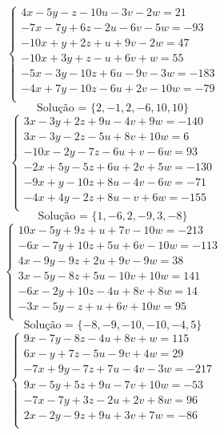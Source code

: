 \documentclass[12pt,oneside,a4paper]{article}
\begin{document}
\vspace{\baselineskip}
\begin{equation*}
\begin{cases}
4x-5y-z-10u-3v-2w=21 \\
-7x-7y+6z-2u-6v-5w=-93 \\
-10x+y+2z+u+9v-2w=47 \\
-10x+3y+z-u+6v+w=55 \\
-5x-3y-10z+6u-9v-3w=-183 \\
-4x+7y-10z-6u+2v-10w=-79 \\
\end{cases}
\end{equation*}
\begin{equation*}
\text{Solução = }\{2,-1,2,-6,10,10\}
\end{equation*}
\vspace{\baselineskip}
\begin{equation*}
\begin{cases}
3x-3y+2z+9u-4v+9w=-140 \\
3x-3y-2z-5u+8v+10w=6 \\
-10x-2y-7z-6u+v-6w=93 \\
-2x+5y-5z+6u+2v+5w=-130 \\
-9x+y-10z+8u-4v-6w=-71 \\
-4x+4y-2z+8u-v+6w=-155 \\
\end{cases}
\end{equation*}
\begin{equation*}
\text{Solução = }\{1,-6,2,-9,3,-8\}
\end{equation*}
\vspace{\baselineskip}
\begin{equation*}
\begin{cases}
10x-5y+9z+u+7v-10w=-213 \\
-6x-7y+10z+5u+6v-10w=-113 \\
4x-9y-9z+2u+9v-9w=38 \\
3x-5y-8z+5u-10v+10w=141 \\
-6x-2y+10z-4u+8v+8w=14 \\
-3x-5y-z+u+6v+10w=95 \\
\end{cases}
\end{equation*}
\begin{equation*}
\text{Solução = }\{-8,-9,-10,-10,-4,5\}
\end{equation*}
\vspace{\baselineskip}
\begin{equation*}
\begin{cases}
9x-7y-8z-4u+8v+w=115 \\
6x-y+7z-5u-9v+4w=29 \\
-7x+9y-7z+7u-4v-3w=-217 \\
9x-5y+5z+9u-7v+10w=-53 \\
-7x-7y+3z-2u+2v+8w=96 \\
2x-2y-9z+9u+3v+7w=-86 \\
\end{cases}
\end{equation*}
\end{document}
